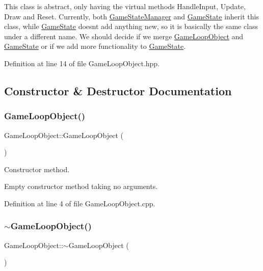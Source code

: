 This class is abstract, only having the virtual methods Handle\+Input, Update, Draw and Reset. Currently, both \hyperlink{class_game_state_manager}{Game\+State\+Manager} and \hyperlink{class_game_state}{Game\+State} inherit this class, while \hyperlink{class_game_state}{Game\+State} doesn\textquotesingle{}t add anything new, so it is basically the same class under a different name. We should decide if we merge \hyperlink{class_game_loop_object}{Game\+Loop\+Object} and \hyperlink{class_game_state}{Game\+State} or if we add more functionality to \hyperlink{class_game_state}{Game\+State}. 

Definition at line 14 of file Game\+Loop\+Object.\+hpp.



\subsection{Constructor \& Destructor Documentation}
\mbox{\label{class_game_loop_object_aa5e0d6adf075fe106b7da8c1c6b19d6b}} 
\subsubsection{\texorpdfstring{Game\+Loop\+Object()}{GameLoopObject()}}
{\footnotesize\ttfamily Game\+Loop\+Object\+::\+Game\+Loop\+Object (\begin{DoxyParamCaption}{ }\end{DoxyParamCaption})}



Constructor method. 

Empty constructor method taking no arguments. 

Definition at line 4 of file Game\+Loop\+Object.\+cpp.

\mbox{\label{class_game_loop_object_afec283bec43cc40dc49c54a7641b4915}} 
\subsubsection{\texorpdfstring{$\sim$\+Game\+Loop\+Object()}{~GameLoopObject()}}
{\footnotesize\ttfamily Game\+Loop\+Object\+::$\sim$\+Game\+Loop\+Object (\begin{DoxyParamCaption}{ }\end{DoxyParamCaption})\hspace{0.3cm}{\ttfamily [virtual]}}



